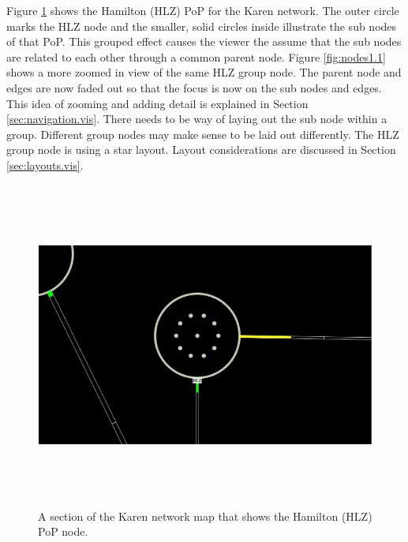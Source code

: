 \documentclass[11pt, a4paper]{article}
\begin{document}
Figure \ref{fig:nodes1.0} shows the Hamilton (HLZ) PoP for the Karen network.
The outer circle marks the HLZ node and the smaller, solid circles inside
illustrate the sub nodes of that PoP. This grouped effect causes the viewer the
assume that the sub nodes are related to each other through a common parent
node. Figure \ref{fig:nodes1.1} shows a more zoomed in view of the same HLZ
group node. The parent node and edges are now faded out so that the focus is now
on the sub nodes and edges. This idea of zooming and adding detail is explained
in Section \ref{sec:navigation.vis}. There needs to be way of laying out the sub
node within a group. Different group nodes may make sense to be laid out
differently.  The HLZ group node is using a star layout. Layout considerations
are discussed in Section \ref{sec:layouts.vis}.

 
\begin{figure}
\centering
\includegraphics[width=170mm,height=107.58mm]{assets/nodes1-0.eps}
\caption{A section of the Karen network map that shows the Hamilton (HLZ) PoP
node.}
\label{fig:nodes1.0}
\end{figure}
\end{document}
